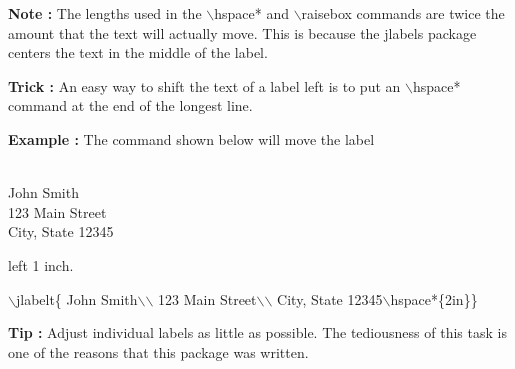 \documentclass[12pt]{amsart}
\newcounter{Object}
\newcounter{SubObject}
\def\ex{\addtocounter{Object}{1}%
         {\bf Example \theObject:}
         \setcounter{SubObject}{0}}
\def\exlabeljohn{%
{ }
\parbox{87pt}{\text{ }\\
John Smith\\
123 Main Street\\
City, State 12345}
{ }}
\def\johncode{%
John Smith\(\backslash\)\(\backslash\)%
123 Main Street\(\backslash\)\(\backslash\)%
City, State 12345}
\def\note{\addtocounter{Object}{1}%
         {\bf Note \theObject:}
         \setcounter{SubObject}{0}}
\def\tip{\addtocounter{Object}{1}%
         {\bf Tip \theObject:}
         \setcounter{SubObject}{0}}
\def\trick{\addtocounter{Object}{1}%
         {\bf Trick \theObject:}
         \setcounter{SubObject}{0}}
\begin{document}
\note
The lengths used in the
\(\backslash\)hspace* and
\(\backslash\)raisebox commands are twice the
amount that the text will actually move.  This is
because the jlabels package centers the text in the
middle of the label.

\trick
An easy way to shift the text of a label left is to put an
\(\backslash\)hspace* command at the end of the longest line.

\ex
The command shown below will move the label \exlabeljohn left 1 inch.

\(\backslash\)jlabelt\{\johncode\(\backslash\)hspace*\{2in\}\}

\tip
Adjust individual labels as little as possible.  The
tediousness of this task is one of the reasons that this
package was written.
\end{document}
